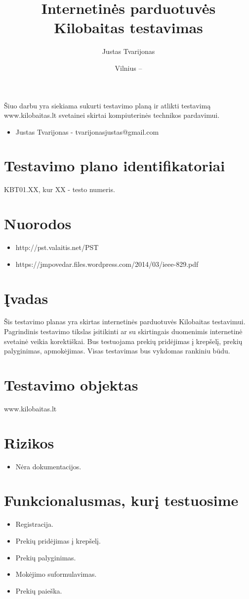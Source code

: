 \documentclass{VUMIFPSkursinis}
\title{Internetinės parduotuvės Kilobaitas testavimas}
\author{Justas Tvarijonas}
\date{Vilnius – \the\year}
\begin{document}
\maketitle
{}
Šiuo darbu yra siekiama sukurti testavimo planą ir atlikti testavimą www.kilobaitas.lt svetainei skirtai kompiuterinės technikos pardavimui.
\begin{itemize}
	\item Justas Tvarijonas - tvarijonasjustas@gmail.com
\end{itemize}
\tableofcontents
{}
\section{Testavimo plano identifikatoriai}
KBT01.XX, kur XX - testo numeris.
\section{Nuorodos}
\begin{itemize}
	\item http://pst.valaitis.net/PST
	\item https://jmpovedar.files.wordpress.com/2014/03/ieee-829.pdf
\end{itemize}
\section{Įvadas}
Šis testavimo planas yra skirtas internetinės parduotuvės Kilobaitas testavimui. Pagrindinis testavimo tikslas įsitikinti ar su skirtingais duomenimis internetinė svetainė veikia korektiškai. Bus testuojama prekių pridėjimas į krepšelį, prekių palyginimas, apmokėjimas. Visas testavimas bus vykdomas rankiniu būdu.
\section{Testavimo objektas}
www.kilobaitas.lt
\section{Rizikos}
\begin{itemize}
	\item Nėra dokumentacijos.
\end{itemize}
\section{Funkcionalusmas, kurį testuosime}
\begin{itemize}
	\item Registracija.
	\item Prekių pridėjimas į krepšelį.
	\item Prekių palyginimas.
	\item Mokėjimo suformulavimas. 
	\item Prekių paieška.
\end{itemize}
\end{document}
